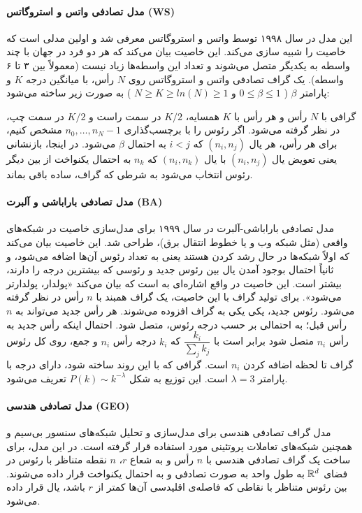\paragraph{مدل تصادفی واتس و استروگاتس (WS)}
این مدل در سال ۱۹۹۸ توسط واتس و استروگاتس معرفی شد و اولین مدلی است که خاصیت  را شبیه سازی می‌کند. این خاصیت بیان می‌کند که هر دو فرد در جهان با چند واسطه به یکدیگر متصل می‌شوند و تعداد این واسطه‌ها زیاد نیست (معمولاً بین ۳ تا ۶ واسطه). یک گراف تصادفی واتس و استروگاتس روی $N$ رأس، با میانگین درجه $K$ و پارامتر $\beta$ (
$0\leq \beta \leq 1$ و $N \geq K \geq ln(N) \geq 1$
) به صورت زیر ساخته می‌شود:
\begin{enumerate}
 گرافی با $N$ رأس و هر رأس با $K$ همسایه، $K/2$ در سمت راست و $K/2$ در سمت چپ، در نظر گرفته می‌شود.
 اگر رئوس را با برچسب‌گذاری $n_0,\ldots,n_N-1$ مشخص کنیم، برای هر رأس، هر یال $(n_i,n_j)$ که $i < j$ به احتمال $\beta$  می‌شود. در اینجا، بازنشانی یعنی تعویض یال $(n_i,n_j)$ با یال $(n_i,n_k)$ که $n_k$ به احتمال یکنواخت از بین دیگر رئوس انتخاب می‌شود به شرطی که گراف، ساده باقی بماند.
\end{enumerate}

\paragraph{مدل تصادفی باراباشی و آلبرت (BA)}
مدل تصادفی باراباشی-آلبرت در سال ۱۹۹۹ برای مدل‌سازی خاصیت  در شبکه‌های واقعی (مثل شبکه وب و یا خطوط انتقال برق)، طراحی شد. این خاصیت بیان می‌کند که اولاً شبکه‌ها در حال رشد کردن هستند یعنی به تعداد رئوس آن‌ها اضافه می‌شود، و ثانیاً احتمال بوجود آمدن یال بین رئوس جدید و رئوسی که بیشترین درجه را دارند، بیشتر است. این خاصیت در واقع اشاره‌ای به  است که بیان می‌کند «پولدار، پولدارتر می‌شود». برای تولید گراف با این خاصیت، یک گراف همبند با $n$ رأس در نظر گرفته می‌شود. رئوس جدید، یکی یکی به گراف افزوده می‌شوند. هر رأس جدید می‌تواند به $n$ رأس قبل؛ به احتمالی بر حسب درجه رئوس، متصل شود. احتمال اینکه رأس جدید به رأس $n_i$ متصل شود برابر است با
$\dfrac{k_i}{\sum_jk_j}$ 
که $k_i$ درجه رأس $n_i$ و جمع، روی کل رئوس گراف تا لحظه اضافه کردن $n_i$ است. گرافی که با این روند ساخته شود، دارای  درجه با پارامتر $\lambda = 3$ است. این توزیع به شکل $P(k) \sim k^{-\lambda}$ تعریف می‌شود.

\paragraph{مدل تصادفی هندسی (GEO)}
مدل گراف تصادفی هندسی برای مدل‌سازی و تحلیل شبکه‌های سنسور بی‌سیم و همچنین شبکه‌های تعاملات پروتئینی مورد استفاده قرار گرفته است. در این مدل، 
برای ساخت یک گراف تصادفی هندسی با $n$ رأس و به شعاع $r$، $n$ نقطه متناظر با رئوس در فضای $\mathbb{R}^d$ به طول واحد به صورت تصادفی و به احتمال یکنواخت قرار داده می‌شوند. بین رئوس متناظر با نقاطی که فاصله‌ی اقلیدسی آن‌ها کمتر از $r$ باشد، یال قرار داده می‌شود.

